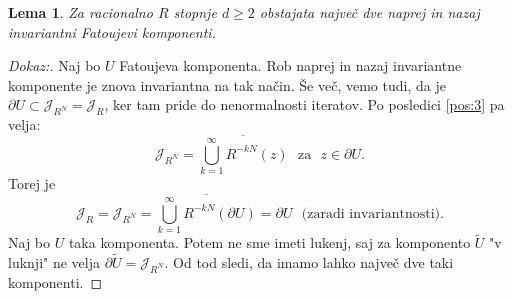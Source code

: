 \documentclass{article}
\newtheorem{lema}{Lema}
\begin{document}
\begin{lema}
Za racionalno $R$ stopnje $d \geq 2$ obstajata največ dve naprej in nazaj 
invariantni Fatoujevi komponenti.
\end{lema}

\begin{proof}[Dokaz:]
Naj bo $U$ Fatoujeva komponenta. 
Rob naprej in nazaj invariantne komponente je znova invariantna na tak način. 
Še več, vemo tudi, da je $\partial U \subset \mathcal{J}_{R^N} = \mathcal{J}_R$, 
ker tam pride do nenormalnosti iteratov. Po posledici \ref{pos:3} pa velja:
$$
\mathcal{J}_{R^N} = \overline{\bigcup_{k=1}^\infty R^{-kN}(z)} \,\,\text{ za }\,\, z\in \partial U.
$$
Torej je
$$
\mathcal{J}_R = \mathcal{J}_{R^N} = \overline{\bigcup_{k=1}^\infty R^{-kN}(\partial U)} = \partial U \,\,\text{ (zaradi invariantnosti).}
$$
Naj bo $U$ taka komponenta. Potem ne sme imeti lukenj, saj za komponento $\tilde{U}$
"v luknji" ne velja $\partial \tilde{U} = \mathcal{J}_{R^N}$. Od tod sledi, 
da imamo lahko največ dve taki komponenti.
\end{proof}
\end{document}
